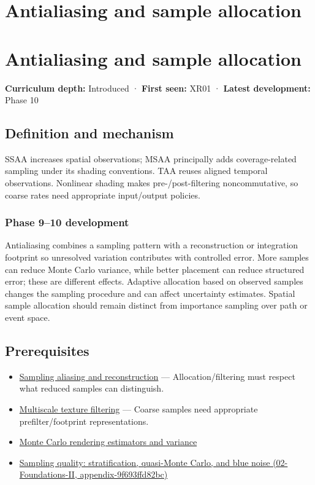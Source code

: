 \hypertarget{appendix-4192b2bdd21e}{}
\section*{Antialiasing and sample allocation}
\section{Antialiasing and sample allocation}\label{appendix-4192b2bdd21e-antialiasing-and-sample-allocation}

\textbf{Curriculum depth:} Introduced · \textbf{First seen:} XR01 · \textbf{Latest development:} Phase 10

\subsection{Definition and mechanism}\label{appendix-4192b2bdd21e-definition-and-mechanism}

SSAA increases spatial observations; MSAA principally adds coverage-related sampling under its shading conventions. TAA reuses aligned temporal observations. Nonlinear shading makes pre-/post-filtering noncommutative, so coarse rates need appropriate input/output policies.

\subsubsection{Phase 9--10 development}\label{appendix-4192b2bdd21e-phase-910-development}

Antialiasing combines a sampling pattern with a reconstruction or integration footprint so unresolved variation contributes with controlled error. More samples can reduce Monte Carlo variance, while better placement can reduce structured error; these are different effects. Adaptive allocation based on observed samples changes the sampling procedure and can affect uncertainty estimates. Spatial sample allocation should remain distinct from importance sampling over path or event space.

\subsection{Prerequisites}\label{appendix-4192b2bdd21e-prerequisites}

\begin{itemize}
\tightlist
\item
  \hyperref[appendix-6a7869dd79a6]{Sampling aliasing and reconstruction} --- Allocation/filtering must respect what reduced samples can distinguish.
\item
  \hyperref[appendix-b677a85ba76f]{Multiscale texture filtering} --- Coarse samples need appropriate prefilter/footprint representations.
\item
  \hyperref[appendix-031e02bf28af]{Monte Carlo rendering estimators and variance}
\item
  \href{../02-Foundations-II/main.pdf\#nameddest=appendix-9f693ffd82bc}{Sampling quality: stratification, quasi-Monte Carlo, and blue noise (02-Foundations-II, appendix-9f693ffd82bc)}
\end{itemize}

